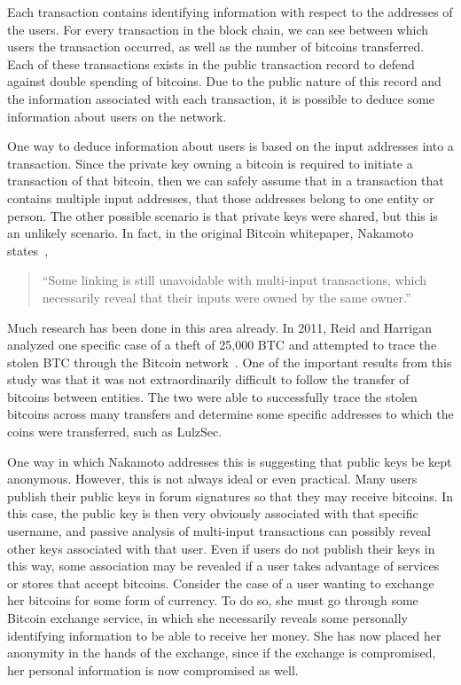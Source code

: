 \documentclass[11pt]{article}
\begin{document}
Each transaction contains identifying information with respect to the addresses
of the users. For every transaction in the block chain, we can see between which
users the transaction occurred, as well as the number of bitcoins transferred.
Each of these transactions exists in the public transaction record to defend
against double spending of bitcoins. Due to the public nature of this record and
the information associated with each transaction, it is possible to deduce some
information about users on the network.

One way to deduce information about users is based on the input addresses into a
transaction. Since the private key owning a bitcoin is required to initiate a
transaction of that bitcoin, then we can safely assume that in a transaction
that contains multiple input addresses, that those addresses belong to one
entity or person. The other possible scenario is that private keys were shared,
but this is an unlikely scenario. In fact, in the original Bitcoin whitepaper,
Nakamoto states~\cite{nakamoto08},
\begin{quote}
``Some linking is still unavoidable with multi-input
transactions, which necessarily reveal that their inputs were owned by the same
owner.''
\end{quote}

Much research has been done in this area already. In 2011, Reid and Harrigan
analyzed one specific case of a theft of 25,000 BTC and attempted to trace the
stolen BTC through the Bitcoin network~\cite{reid11}. One of the important
results from this study was that it was not extraordinarily difficult to follow
the transfer of bitcoins between entities. The two were able to successfully
trace the stolen bitcoins across many transfers and determine some specific
addresses to which the coins were transferred, such as LulzSec.

One way in which Nakamoto addresses this is suggesting that public keys be kept
anonymous. However, this is not always ideal or even practical. Many users
publish their public keys in forum signatures so that they may receive bitcoins.
In this case, the public key is then very obviously associated with that
specific username, and passive analysis of multi-input transactions can possibly
reveal other keys associated with that user. Even if users do not publish their
keys in this way, some association may be revealed if a user takes advantage of
services or stores that accept bitcoins. Consider the case of a user wanting to
exchange her bitcoins for some form of currency. To do so, she must go through
some Bitcoin exchange service, in which she necessarily reveals some personally
identifying information to be able to receive her money. She has now placed her
anonymity in the hands of the exchange, since if the exchange is compromised,
her personal information is now compromised as well.
\end{document}
